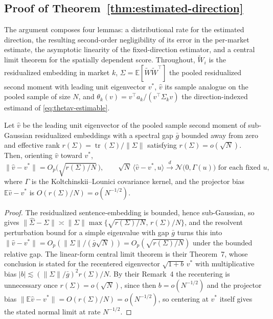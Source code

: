 \subsection{Proof of Theorem~\ref{thm:estimated-direction}}
\label{app:estimated-direction-proof}

The argument composes four lemmas: a distributional rate for the estimated direction,
the resulting second-order negligibility of its error in the per-market estimate, the
asymptotic linearity of the fixed-direction estimator, and a central limit theorem for
the spatially dependent score. Throughout, $\tilde W_i$ is the residualized embedding
in market $k$, $\Sigma=\mathbb{E}[\tilde W\tilde W^\top]$ the pooled residualized
second moment with leading unit eigenvector $v^\ast$, $\hat v$ its sample analogue on
the pooled sample of size $N$, and $\theta_k(v)=v^\top a_k/(v^\top\Sigma_k v)$ the
direction-indexed estimand of \eqref{eq:thetav-estimable}.

\begin{lemma}\label{lem:ed-direction}
Let $\hat v$ be the leading unit eigenvector of the pooled sample second moment of
sub-Gaussian residualized embeddings with a spectral gap $\bar g$ bounded away from
zero and effective rank $r(\Sigma)=\operatorname{tr}(\Sigma)/\lVert\Sigma\rVert$
satisfying $r(\Sigma)=o(\sqrt N)$. Then, orienting $\hat v$ toward $v^\ast$,
\[
\lVert\hat v-v^\ast\rVert=O_p\!\bigl(\sqrt{r(\Sigma)/N}\,\bigr),
\qquad
\sqrt N\,\langle\hat v-v^\ast,u\rangle\xrightarrow{d}\mathcal N\!\bigl(0,\Gamma(u)\bigr)
\text{ for each fixed }u,
\]
where $\Gamma$ is the Koltchinskii--Lounici covariance kernel, and the projector bias
$\mathbb{E}\hat v-v^\ast$ is $O(r(\Sigma)/N)=o(N^{-1/2})$.
\end{lemma}

\begin{proof}
The residualized sentence-embedding is bounded, hence sub-Gaussian, so
\citet[Theorem~1]{koltchinskii2016asymptotics} gives $\lVert\hat\Sigma-\Sigma\rVert
\asymp\lVert\Sigma\rVert\max\{\sqrt{r(\Sigma)/N},\,r(\Sigma)/N\}$, and the
resolvent perturbation bound for a simple eigenvalue with gap $\bar g$ turns this into
$\lVert\hat v-v^\ast\rVert=O_p(\lVert\Sigma\rVert/(\bar g\sqrt N))=
O_p(\sqrt{r(\Sigma)/N})$ under the bounded relative gap. The linear-form central limit
theorem is their Theorem~7, whose conclusion is stated for the recentered eigenvector
$\sqrt{1+b}\,v^\ast$ with multiplicative bias $|b|\lesssim
(\lVert\Sigma\rVert/\bar g)^2 r(\Sigma)/N$. By their Remark~4 the recentering is
unnecessary once $r(\Sigma)=o(\sqrt N)$, since then $b=o(N^{-1/2})$ and the projector
bias $\lVert\mathbb{E}\hat v-v^\ast\rVert=O(r(\Sigma)/N)=o(N^{-1/2})$, so centering at
$v^\ast$ itself gives the stated normal limit at rate $N^{-1/2}$.
\end{proof}

